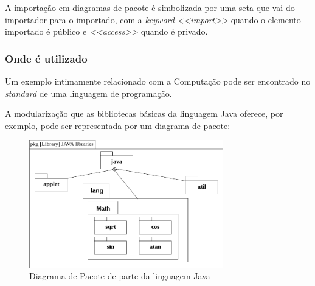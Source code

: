 A importação em diagramas de pacote é simbolizada por uma seta que vai do importador para o importado, com a \textit{keyword} \textit{<<import>>} quando o elemento importado é público e \textit{<<access>>} quando é privado.


\subsubsection{Onde é utilizado}
Um exemplo intimamente relacionado com a Computação pode ser encontrado no \textit{standard} de uma linguagem de programação. 

A modularização que as bibliotecas básicas da linguagem Java oferece, por exemplo, pode ser representada por um diagrama de pacote:

\begin{figure}[h]
\centering
\includegraphics[width=0.75\textwidth]{figures/diagrama-pacote.png}
\caption{Diagrama de Pacote de parte da linguagem Java}
\label{fig:package_diagram}
\end{figure}